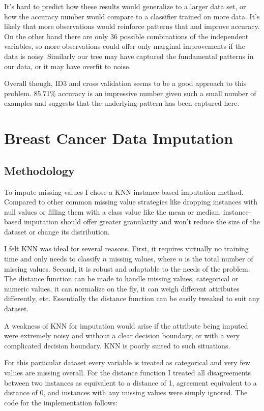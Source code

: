 \documentclass[11pt, letterpaper]{report}
\begin{document}
It's hard to predict how these results would generalize to a larger data set, or how the accuracy number would compare to a classifier trained on more data. It's likely that more observations would reinforce patterns that and improve accuracy. On the other hand there are only 36 possible combinations of the independent variables, so more observations could offer only marginal improvements if the data is noisy. Similarly our tree may have captured the fundamental patterns in our data, or it may have overfit to noise.

Overall though, ID3 and cross validation seems to be a good approach to this problem. 85.71\% accuracy is an impressive number given such a small number of examples and suggests that the underlying pattern has been captured here.

\section{Breast Cancer Data Imputation}

\subsection{Methodology}

To impute missing values I chose a KNN instance-based imputation method. Compared to other common missing value strategies like dropping instances with null values or filling them with a class value like the mean or median, instance-based imputation should offer greater granularity and won't reduce the size of the dataset or change its distribution.

I felt KNN was ideal for several reasons. First, it requires virtually no training time and only needs to classify $n$ missing values, where $n$ is the total number of missing values. Second, it is robust and adaptable to the needs of the problem. The distance function can be made to handle missing values, categorical or numeric values, it can normalize on the fly, it can weigh different attributes differently, etc. Essentially the distance function can be easily tweaked to suit any dataset.

A weakness of KNN for imputation would arise if the attribute being imputed were extremely noisy and without a clear decision boundary, or with a very complicated decision boundary. KNN is poorly suited to such situations.

For this particular dataset every variable is treated as categorical and very few values are missing overall. For the distance function I treated all disagreements between two instances as equivalent to a distance of 1, agreement equivalent to a distance of 0, and instances with any missing values were simply ignored. The code for the implementation follows:
\end{document}
